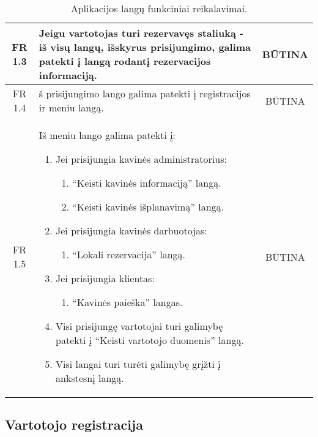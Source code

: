 \documentclass{VUMIFPSkursinis}
\begin{document}
\begin{center}
\begin{table}[H]
\begin{tabular}{|p{2cm}|p{}|p{}|}
		\multicolumn{1}{|c|}{FR 1.3}&
		{Jeigu vartotojas turi rezervavęs staliuką - iš visų langų, išskyrus \newline prisijungimo, galima patekti į langą rodantį rezervacijos informaciją.}&
		\multicolumn{1}{|c|}{BŪTINA}\\
	\hline
		\multicolumn{1}{|c|}{FR 1.4}&
		{š prisijungimo lango galima patekti į registracijos ir meniu langą.}&
		\multicolumn{1}{|c|}{BŪTINA}\\
	\hline
		\multicolumn{1}{|c|}{FR 1.5}&
		{Iš meniu lango galima patekti į:\newline
		\begin{enumerate}
			\item Jei prisijungia kavinės administratorius:
				\begin{enumerate}
					\item “Keisti kavinės informaciją” langą.
					\item “Keisti kavinės išplanavimą” langą.
				\end{enumerate}
			\item Jei prisijungia kavinės darbuotojas:
				\begin{enumerate}
					\item “Lokali rezervacija” langą.
				\end{enumerate}
			\item Jei prisijungia klientas:
				\begin{enumerate}
					\item “Kavinės paieška” langas.
				\end{enumerate}
			\item Visi prisijungę vartotojai turi galimybę patekti į “Keisti vartotojo duomenis” langą.
			\item Visi langai turi turėti galimybę grįžti į ankstesnį langą.
		\end{enumerate}
		}&
		\multicolumn{1}{|c|}{BŪTINA}\\		
	\hline
	
	\end{tabular}
	\caption{Aplikacijos langų funkciniai reikalavimai.}
	\label{table:AplikacijosLangai}
	\end{table}
	
\end{center}

\pagebreak

\subsection{Vartotojo registracija}
\end{document}

